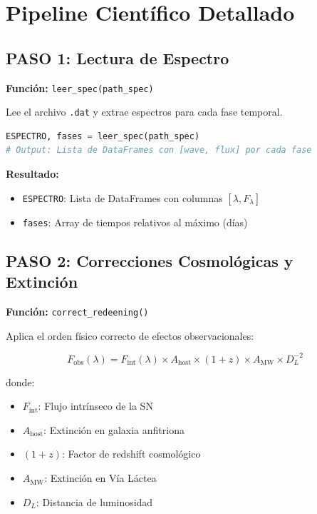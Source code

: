 \documentclass[11pt,a4paper]{article}
\begin{document}
\section{Pipeline Científico Detallado}

\subsection{PASO 1: Lectura de Espectro}

\textbf{Función:} \texttt{leer\_spec(path\_spec)}

Lee el archivo \texttt{.dat} y extrae espectros para cada fase temporal.

\begin{lstlisting}[language=Python, caption=Lectura de espectro]
ESPECTRO, fases = leer_spec(path_spec)
# Output: Lista de DataFrames con [wave, flux] por cada fase
\end{lstlisting}

\textbf{Resultado:}
\begin{itemize}
    \item \texttt{ESPECTRO}: Lista de DataFrames con columnas $[\lambda, F_\lambda]$
    \item \texttt{fases}: Array de tiempos relativos al máximo (días)
\end{itemize}

\subsection{PASO 2: Correcciones Cosmológicas y Extinción}

\textbf{Función:} \texttt{correct\_redeening()}

Aplica el orden físico correcto de efectos observacionales:

\begin{equation}
F_{\text{obs}}(\lambda) = F_{\text{int}}(\lambda) \times A_{\text{host}} \times (1+z) \times A_{\text{MW}} \times D_L^{-2}
\end{equation}

donde:
\begin{itemize}
    \item $F_{\text{int}}$: Flujo intrínseco de la SN
    \item $A_{\text{host}}$: Extinción en galaxia anfitriona
    \item $(1+z)$: Factor de redshift cosmológico
    \item $A_{\text{MW}}$: Extinción en Vía Láctea
    \item $D_L$: Distancia de luminosidad
\end{itemize}
\end{document}

